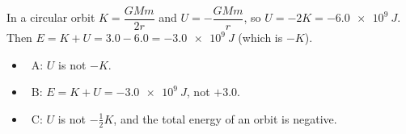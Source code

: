 \documentclass[12pt]{article}
\begin{document}
\begin{practiceanswers}
\begin{practiceans}
  In a circular orbit $K = \dfrac{GMm}{2r}$ and $U = -\dfrac{GMm}{r}$, so $U = -2K = \qty{-6.0e9}{J}$.
  Then $E = K + U = 3.0 - 6.0 = \qty{-3.0e9}{J}$ (which is $-K$).
  \begin{itemize}
    \item \xmark\ A: $U$ is not $-K$.
    \item \xmark\ B: $E = K + U = \qty{-3.0e9}{J}$, not $+3.0$.
    \item \xmark\ C: $U$ is not $-\frac{1}{2}K$, and the total energy of an orbit is negative.
  \end{itemize}
\end{practiceans}

\end{practiceanswers}
\end{document}
